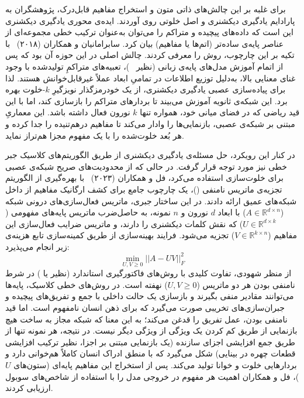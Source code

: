 برای غلبه بر این چالش‌های ذاتی متون و استخراج مفاهیم قابل‌درک، پژوهشگران به پارادایم یادگیری دیکشنری و اصل خلوتی روی آوردند. ایده‌ی محوری یادگیری دیکشنری این است که داده‌های پیچیده و متراکم را می‌توان به‌عنوان ترکیب خطی مجموعه‌ای از عناصر پایه‌ی ساده‌تر (اتم‌ها یا مفاهیم) بیان کرد. سابرامانیان و همکاران (۲۰۱۸)~\cite{subramanian2018spine} با تکیه بر این چارچوب، روش  را معرفی کردند. چالش اصلی در این حوزه آن بود که پس از اتمام آموزش مدل‌های پایه‌ی زبانی (نظیر ~\cite{mikolov2013efficient})، تعبیه‌های متراکمِ تولیدشده با وجود غنای معنایی بالا، به‌دلیل توزیع اطلاعات در تمامیِ ابعاد عملاً غیرقابل‌خوانش هستند. لذا  برای پیاده‌سازی عصبی یادگیری دیکشنری، از یک خودرمزگذار نویزگیرِ $k$-خلوت بهره برد. این شبکه‌ی ثانویه آموزش می‌بیند تا بردارهای متراکم را بازسازی کند، اما با این قید ریاضی که در فضای میانی خود، همواره تنها $k$ نورون فعال داشته باشد. این معماریِ مبتنی بر شبکه‌ی عصبی، بازنمایی‌ها را وادار می‌کند تا مفاهیم درهم‌تنیده را جدا کرده و هر بُعد خلوت‌شده را با یک مفهوم مجزا هم‌تراز نماید.

در کنار این رویکرد، حل مسئله‌ی یادگیری دیکشنری از طریق الگوریتم‌های کلاسیک جبر خطی نیز مورد توجه قرار گرفت. در حالی که  از محدودیت‌های صریح شبکه‌ی عصبی برای خلوت‌سازی استفاده می‌کرد، فل و همکاران (۲۰۲۳)~\cite{fel2023holistic} با بهره‌گیری از الگوریتم تجزیه‌ی ماتریس نامنفی ()، یک چارچوب جامع برای کشف ارگانیک مفاهیم از داخل شبکه‌های عمیق ارائه دادند. در این ساختار جبری، ماتریس فعال‌سازی‌های درونی شبکه ($A \in \mathbb{R}^{d \times n}$) با ابعاد $d$ نورون و $n$ نمونه، به حاصل‌ضرب ماتریس پایه‌های مفهومی ($U \in \mathbb{R}^{d \times k}$) که نقش کلمات دیکشنری را دارند، و ماتریس ضرایب فعال‌سازی این مفاهیم ($V \in \mathbb{R}^{k \times n}$) تجزیه می‌شود. فرایند بهینه‌سازی از طریق کمینه‌سازی تابع هزینه‌ی زیر انجام می‌پذیرد:
\begin{equation}\label{eq:chap3_nmf}
    \min_{U,V \ge 0} ||A - UV||_F^2
\end{equation}
از منظر شهودی، تفاوت کلیدی  با روش‌های فاکتورگیری استاندارد (نظیر  یا ) در شرط نامنفی بودن هر دو ماتریس ($U, V \ge 0$) نهفته است. در روش‌های خطی کلاسیک، پایه‌ها می‌توانند مقادیر منفی بگیرند و بازسازی یک حالت داخلی با جمع و تفریق‌های پیچیده و جبران‌سازی‌های تخریبی صورت می‌گیرد که برای ذهن انسان نامفهوم است. اما قید نامنفی بودن، عمل تفریق را قدغن می‌کند؛ به این معنا که شبکه مجاز به ساخت هیچ بازنمایی از طریق کم کردن یک ویژگی از ویژگی دیگر نیست. در نتیجه، هر نمونه تنها از طریق جمع افزایشی اجزای سازنده (یک بازنمایی مبتنی بر اجزا، نظیر ترکیب افزایشی قطعات چهره در بینایی) شکل می‌گیرد که با منطق ادراک انسان کاملاً هم‌خوانی دارد و بردارهایی خلوت و خوانا تولید می‌کند. پس از استخراج این مفاهیم پایه‌ای (ستون‌های $U$)، فل و همکاران اهمیت هر مفهوم در خروجی مدل را با استفاده از شاخص‌های سوبول ارزیابی کردند.

